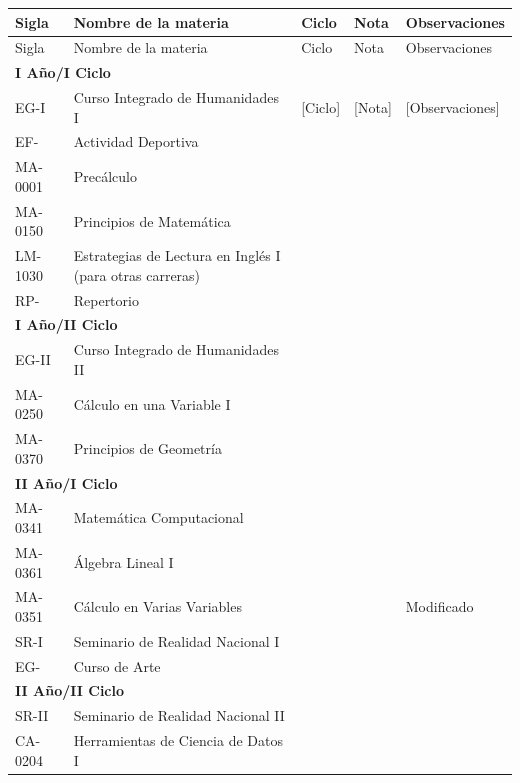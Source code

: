 \begin{longtable}{|p{2cm}|p{7cm}|p{1.6cm}|p{1.6cm}|p{2.8cm}|}
\hline
\rowcolor[HTML]{00C0F3}
Sigla & Nombre de la materia & Ciclo & Nota & Observaciones \\ \hline
\endfirsthead
\hline
\rowcolor[HTML]{00C0F3}
Sigla & Nombre de la materia & Ciclo & Nota & Observaciones \\ \hline
\endhead
\multicolumn{5}{|l|}{\cellcolor[HTML]{E6E6E6}\textbf{I Año/I Ciclo}} \\ \hline
EG-I & Curso Integrado de Humanidades I & [Ciclo] & [Nota] & [Observaciones] \\ \hline
EF- & Actividad Deportiva &  &  &  \\ \hline
MA-0001 & Precálculo &  &  &  \\ \hline
MA-0150 & Principios de Matemática &  &  &  \\ \hline
LM-1030 & Estrategias de Lectura en Inglés I (para otras carreras) &  &  &  \\ \hline
RP- & Repertorio &  &  &  \\ \hline
\multicolumn{5}{|l|}{\cellcolor[HTML]{E6E6E6}\textbf{I Año/II Ciclo}} \\ \hline
EG-II & Curso Integrado de Humanidades II &  &  &  \\ \hline
MA-0250 & Cálculo en una Variable I &  &  &  \\ \hline
MA-0370 & Principios de Geometría &  &  &  \\ \hline
\multicolumn{5}{|l|}{\cellcolor[HTML]{E6E6E6}\textbf{II Año/I Ciclo}} \\ \hline
MA-0341 & Matemática Computacional &  &  &  \\ \hline
MA-0361 & Álgebra Lineal I &  &  &  \\ \hline
MA-0351 & Cálculo en Varias Variables &  &  & Modificado \\ \hline
SR-I & Seminario de Realidad Nacional I &  &  &  \\ \hline
EG- & Curso de Arte &  &  &  \\ \hline
\multicolumn{5}{|l|}{\cellcolor[HTML]{E6E6E6}\textbf{II Año/II Ciclo}} \\ \hline
SR-II & Seminario de Realidad Nacional II &  &  &  \\ \hline
CA-0204 & Herramientas de Ciencia de Datos I &  &  &  \\ \hline

\end{longtable}
